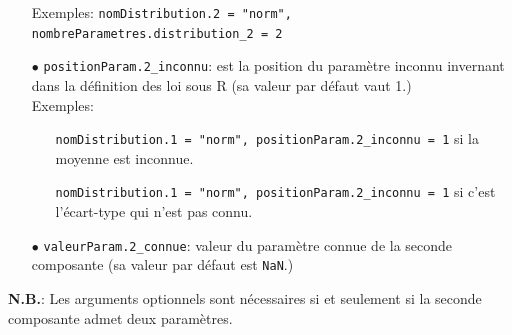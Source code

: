 \documentclass{article}
\newenvironment{fonction}[1][htb]
  {\renewcommand{\algorithmcfname}{Fonction}%
   \begin{algorithm}[#1]%
  }{\end{algorithm}}
\begin{document}
\begin{fonction}[h!]
\begin{itemize}
                 \vspace*{0.2cm}
                 Exemples: \texttt{nomDistribution.2 = "norm", nombreParametres.distribution\_2 = 2}
                 \vspace*{0.2cm}
                 \item[$\bullet$] \texttt{positionParam.2\_inconnu}: est la position du paramètre inconnu invernant dans la définition des loi sous R (sa valeur par défaut vaut 1.) \\
                 \vspace*{0.2cm}
                 Exemples: 
                     \begin{itemize}
                         \item[] \texttt{nomDistribution.1 = "norm", positionParam.2\_inconnu = 1} si la moyenne est inconnue. 
                         \item[] \texttt{nomDistribution.1 = "norm", positionParam.2\_inconnu = 1} si c'est l'écart-type qui n'est pas connu. 
                     \end{itemize}
                 \vspace*{0.2cm}
                 \item[$\bullet$] \texttt{valeurParam.2\_connue}: valeur du paramètre connue de la seconde composante (sa valeur par défaut est \texttt{NaN}.)
             \end{itemize}
     \end{fonction}
     \textbf{N.B.}: Les arguments optionnels sont nécessaires si et seulement si la seconde composante admet deux paramètres.
\newpage
\end{document}
